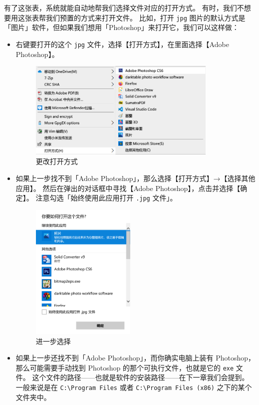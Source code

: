 有了这张表，系统就能自动地帮我们选择文件对应的打开方式。
有时，我们不想要用这张表帮我们预置的方式来打开文件。
比如，打开 \verb|jpg| 图片的默认方式是「图片」软件，但如果我们想用「Photoshop」来打开它，我们可以这样做：

\begin{itemize}
  \item 右键要打开的这个 \verb|jpg| 文件，选择【打开方式】，在里面选择【Adobe Photoshop】。
    \begin{figure}[htb!]
      \centering
      \includegraphics[width=9cm]{assets/Select_Open_with.png}
      \caption{更改打开方式}
      \label{Select_Open_with}
    \end{figure}
  \item 如果上一步找不到「Adobe Photoshop」，那么选择【打开方式】→【选择其他应用】。
    然后在弹出的对话框中寻找【Adobe Photoshop】，点击并选择【确定】。
    注意勾选「始终使用此应用打开 \verb|.jpg| 文件」。
    \begin{figure}[htb!]
      \centering
      \includegraphics[width=5cm]{assets/Open_with.png}
      \caption{进一步选择}
      \label{Open_with}
    \end{figure}
  \item 如果上一步还找不到「Adobe Photoshop」，而你确实电脑上装有 Photoshop，那么可能需要手动找到 Photoshop 的那个可执行文件，也就是它的 \verb|exe| 文件。
    这个文件的路径——也就是软件的安装路径——在下一章我们会提到。
    一般来说是在 \verb|C:\Program Files| 或者 \verb|C:\Program Files (x86)| 之下的某个文件夹中。
\end{itemize}

